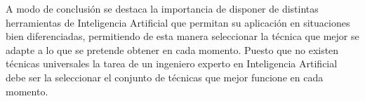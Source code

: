 \documentclass[12pt,a4paper, xcolor=table]{article}
\begin{document}
  \vspace{2mm}

  A modo de conclusión se destaca la importancia de disponer de distintas herramientas de Inteligencia Artificial que permitan su aplicación en situaciones bien diferenciadas, permitiendo de esta manera seleccionar la técnica que mejor se adapte a lo que se pretende obtener en cada momento. Puesto que no existen técnicas universales la tarea de un ingeniero experto en Inteligencia Artificial debe ser la seleccionar el conjunto de técnicas que mejor funcione en cada momento.

\clearpage



\end{document}
